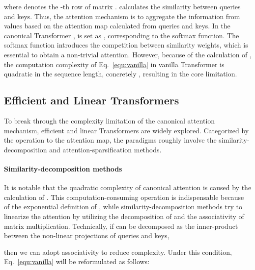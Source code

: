 \documentclass[nohyperref]{article}
\theoremstyle{plain}
\theoremstyle{definition}
\theoremstyle{remark}
\begin{document}
where  denotes the -th row of matrix .  calculates the similarity between queries and keys. Thus, the attention mechanism is to aggregate the information from values based on the attention map calculated from queries and keys. In the canonical Transformer \cite{NIPS2017_3f5ee243},  is set as , corresponding to the softmax function. The softmax function introduces the competition between similarity weights, which is essential to obtain a non-trivial attention. However, because of the calculation of , the computation complexity of Eq.~\eqref{equ:vanilla} in vanilla Transformer is quadratic in the sequence length, concretely , resulting in the core limitation.

\vspace{-5pt}
\subsection{Efficient and Linear Transformers}

To break through the complexity limitation of the canonical attention mechanism, efficient and linear Transformers are widely explored. Categorized by the operation to the attention map, the paradigms roughly involve the similarity-decomposition and attention-sparsification methods.

\vspace{-5pt}
\paragraph{Similarity-decomposition methods} 
It is notable that the quadratic complexity of canonical attention is caused by the calculation of . This computation-consuming operation is indispensable because of the exponential definition of , while similarity-decomposition methods try to linearize the attention by utilizing the decomposition of  and the associativity of matrix multiplication. Technically, if  can be decomposed as the inner-product between the non-linear projections  of queries and keys,

then we can adopt associativity to reduce complexity. Under this condition, Eq.~\eqref{equ:vanilla} will be reformulated as follows:
\end{document}
